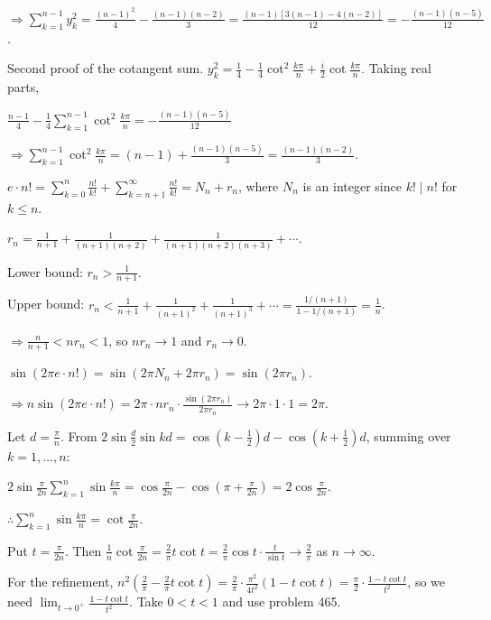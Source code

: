   $\Rightarrow\displaystyle\sum_{k = 1}^{n - 1}y_k^2 = \frac{(n - 1)^2}{4} - \frac{(n - 1)(n - 2)}{3}
  = \frac{(n - 1)[3(n - 1) - 4(n - 2)]}{12} = -\frac{(n - 1)(n - 5)}{12}$.

  Second proof of the cotangent sum. $y_k^2 = \frac{1}{4} - \frac{1}{4}\cot^2\frac{k\pi}{n} +
  \frac{i}{2}\cot\frac{k\pi}{n}$. Taking real parts,

  $\frac{n - 1}{4} - \frac{1}{4}\displaystyle\sum_{k = 1}^{n - 1}\cot^2\frac{k\pi}{n} = -\frac{(n - 1)(n -
    5)}{12}$

  $\Rightarrow\displaystyle\sum_{k = 1}^{n - 1}\cot^2\frac{k\pi}{n} = (n - 1) + \frac{(n - 1)(n - 5)}{3}
  = \frac{(n - 1)(n - 2)}{3}$.
\item $e\cdot n! = \displaystyle\sum_{k = 0}^n\frac{n!}{k!} + \sum_{k = n + 1}^\infty\frac{n!}{k!} = N_n + r_n$,
  where $N_n$ is an integer since $k!\mid n!$ for $k\leq n$.

  $r_n = \frac{1}{n + 1} + \frac{1}{(n + 1)(n + 2)} + \frac{1}{(n + 1)(n + 2)(n + 3)} + \cdots$.

  Lower bound: $r_n > \frac{1}{n + 1}$.

  Upper bound: $r_n < \frac{1}{n + 1} + \frac{1}{(n + 1)^2} + \frac{1}{(n + 1)^3} + \cdots = \frac{1/(n +
    1)}{1 - 1/(n + 1)} = \frac{1}{n}$.

  $\Rightarrow\frac{n}{n + 1} < nr_n < 1$, so $nr_n\to 1$ and $r_n\to 0$.

  $\sin(2\pi e\cdot n!) = \sin(2\pi N_n + 2\pi r_n) = \sin(2\pi r_n)$.

  $\Rightarrow n\sin(2\pi e\cdot n!) = 2\pi\cdot nr_n\cdot\frac{\sin(2\pi r_n)}{2\pi r_n}\to 2\pi\cdot 1\cdot 1 =
  2\pi$.
\item Let $d = \frac{\pi}{n}$. From $2\sin\frac{d}{2}\sin kd = \cos\left(k - \frac{1}{2}\right)d - \cos\left(k
  + \frac{1}{2}\right)d$, summing over $k = 1, \ldots, n$:

  $2\sin\frac{\pi}{2n}\displaystyle\sum_{k = 1}^n\sin\frac{k\pi}{n} = \cos\frac{\pi}{2n} - \cos\left(\pi +
  \frac{\pi}{2n}\right) = 2\cos\frac{\pi}{2n}$.

  $\therefore\displaystyle\sum_{k = 1}^n\sin\frac{k\pi}{n} = \cot\frac{\pi}{2n}$.

  Put $t = \frac{\pi}{2n}$. Then $\frac{1}{n}\cot\frac{\pi}{2n} = \frac{2}{\pi}t\cot t = \frac{2}{\pi}\cos
  t\cdot\frac{t}{\sin t}\to\frac{2}{\pi}$ as $n\to\infty$.

  For the refinement, $n^2\left(\frac{2}{\pi} - \frac{2}{\pi}t\cot t\right) = \frac{2}{\pi}\cdot\frac{\pi^2}{4t^2}(1
  - t\cot t) = \frac{\pi}{2}\cdot\frac{1 - t\cot t}{t^2}$, so we need $\displaystyle\lim_{t\to 0^+}\frac{1 -
    t\cot t}{t^2}$. Take $0 < t < 1$ and use problem 465.

